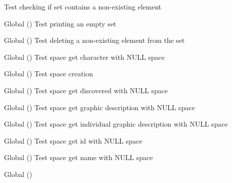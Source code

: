 \begin{DoxyRefList}
%
Test checking if set contains a non-\/existing element  
\item[Global \doxylink{set__test_8c_a41ec3a4fd0af7d960f6b80561f9fec08}{test2\+\_\+set\+\_\+print} ()]\label{test__test000169}%
%
Test printing an empty set  
\item[Global \doxylink{set__test_8c_ae89af247bc1f5811ae037774e1920ff7}{test2\+\_\+set\+\_\+remove\+\_\+id} ()]\label{test__test000161}%
%
Test deleting a non-\/existing element from the set  
\item[Global \doxylink{space__test_8c_ad30236118e148fd4abe41cc83e254165}{test2\+\_\+space\+\_\+add\+\_\+character} ()]\label{test__test000199}%
%
Test space get character with NULL space  
\item[Global \doxylink{space__test_8c_a012cd3cf37a8d91e2d7098a264c29d65}{test2\+\_\+space\+\_\+create} ()]\label{test__test000171}%
%
Test space creation  
\item[Global \doxylink{space__test_8c_a64ea5465e55d87db62b95d88d6ecfb69}{test2\+\_\+space\+\_\+get\+\_\+discovered} ()]\label{test__test000193}%
%
Test space get discovered with NULL space  
\item[Global \doxylink{space__test_8c_a3422f19fd8a821a06ccba2feb52034c2}{test2\+\_\+space\+\_\+get\+\_\+gdesc} ()]\label{test__test000191}%
%
Test space get graphic description with NULL space  
\item[Global \doxylink{space__test_8c_ad1f3c6d156d05fd4778acaaf146755e3}{test2\+\_\+space\+\_\+get\+\_\+i\+\_\+dynamic\+\_\+description} ()]\label{test__test000205}%
%
Test space get individual graphic description with NULL space  
\item[Global \doxylink{space__test_8c_af9087176b0d3c41d83a17a4918b13e31}{test2\+\_\+space\+\_\+get\+\_\+id} ()]\label{test__test000178}%
%
Test space get id with NULL space  
\item[Global \doxylink{space__test_8c_aee88ed31c63efc674051a4563aed86e2}{test2\+\_\+space\+\_\+get\+\_\+name} ()]\label{test__test000180}%
%
Test space get name with NULL space  
\item[Global \doxylink{space__test_8c_a0b036973034eb7e3ff71ad43dcdea0a3}{test2\+\_\+space\+\_\+get\+\_\+num\+\_\+objects} ()]\label{test__test000197}%
%

\end{DoxyRefList}
